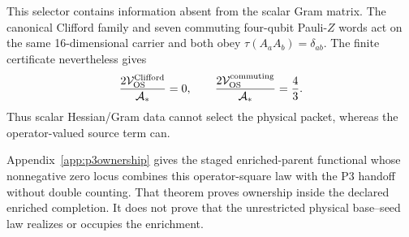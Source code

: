 \documentclass[11pt]{article}
\begin{document}
This selector contains information absent from the scalar Gram matrix.  The
canonical Clifford family and seven commuting four-qubit Pauli-$Z$ words act
on the same 16-dimensional carrier and both obey
$\tau(A_aA_b)=\delta_{ab}$.  The finite certificate nevertheless gives
\begin{equation}
 {2\mathcal V_{\rm OS}^{\rm Clifford}\over\mathcal A_*}=0,
 \qquad
 {2\mathcal V_{\rm OS}^{\rm commuting}\over\mathcal A_*}={4\over3}.
 \label{eq:p3operatorsquarecontrol}
\end{equation}
Thus scalar Hessian/Gram data cannot select the physical packet, whereas the
operator-valued source term can.

Appendix~\ref{app:p3ownership} gives the staged enriched-parent functional
whose nonnegative zero locus combines this operator-square law with the P3
handoff without double counting.  That theorem proves ownership inside the
declared enriched completion.  It does not prove that the unrestricted
physical base--seed law realizes or occupies the enrichment.
\end{document}
